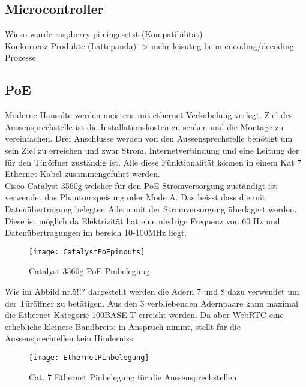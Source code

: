 \subsection{Microcontroller}
\label{sec:microcontroller}
Wieso wurde raspberry pi eingesetzt (Kompatibilität)
\\
Konkurrenz Produkte (Lattepanda) -> mehr leisutng beim encoding/decoding Prozesse
\\

\subsection{PoE}
\label{sec:poe}
Moderne Hausalte werden meistens mit ethernet Verkabelung verlegt. Ziel des Aussensprechstelle ist die Installationskosten zu senken und die Montage zu vereinfachen. Drei Anschlusse werden von den Aussensprechstelle benötigt um sein Ziel zu erreichen und zwar Strom, Internetverbindung und eine Leitung der für den Türöffner zuständig ist. Alle diese Fünktionalität können in einem Kat 7 Ethernet Kabel zusammengeführt werden. 
\\
Cisco Catalyst 3560g welcher für den PoE Stromversorgung zuständigt ist verwendet das Phantomspeisung oder Mode A. Das heisst dass die mit Datenübertragung belegten Adern mit der Stromversorgung überlagert werden. Diese ist möglich da Elektrizität hat eine niedrige Frequenz von 60 Hz und Datenübertragungen im bereich 10-100MHz liegt.

\begin{figure}[htb!]
	\begin{center}
		\texttt{[image: CatalystPoEpinouts]}
		\caption[Catalyst Pinouts]{Catalyst 3560g PoE Pinbelegung}
		\label{fig:catalystPinouts}
	\end{center}
\end{figure}

Wie im Abbild nr.5!!? dargestellt werden die Adern 7 und 8 dazu verwendet um der Türöffner zu betätigen. Aus den 3 verbliebenden Adernpaare kann maximal die Ethernet Kategorie 100BASE-T erreicht werden. Da aber WebRTC eine erhebliche kleinere Bandbreite in Anspruch nimmt, stellt für die Aussensprechtellen kein Hinderniss.

\begin{figure}[htb!]
	\begin{center}
		\texttt{[image: EthernetPinbelegung]}
		\caption[EthernetPinbelegung]{Cat. 7 Ethernet Pinbelegung für die Aussensprechstellen}
		\label{fig:catalystPinouts}
	\end{center}
\end{figure}


\newpage